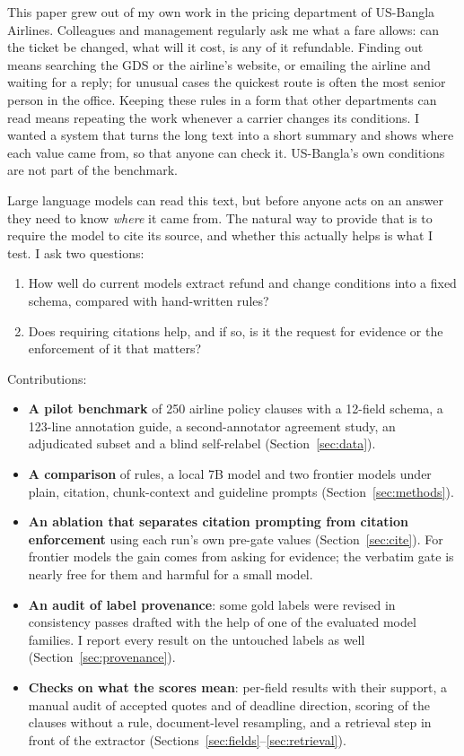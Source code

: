\documentclass[11pt,a4paper]{article}
\begin{document}
This paper grew out of my own work in the pricing department of US-Bangla Airlines. Colleagues and management regularly ask me what a fare allows: can the ticket be changed, what will it cost, is any of it refundable. Finding out means searching the GDS or the airline's website, or emailing the airline and waiting for a reply; for unusual cases the quickest route is often the most senior person in the office. Keeping these rules in a form that other departments can read means repeating the work whenever a carrier changes its conditions. I wanted a system that turns the long text into a short summary and shows where each value came from, so that anyone can check it. US-Bangla's own conditions are not part of the benchmark.

Large language models can read this text, but before anyone acts on an answer they need to know \emph{where} it came from. The natural way to provide that is to require the model to cite its source, and whether this actually helps is what I test. I ask two questions:
\begin{enumerate}
  \item How well do current models extract refund and change conditions into a fixed schema, compared with hand-written rules?
  \item Does requiring citations help, and if so, is it the request for evidence or the enforcement of it that matters?
\end{enumerate}

\noindent Contributions:
\begin{itemize}
  \item \textbf{A pilot benchmark} of 250 airline policy clauses with a 12-field schema, a 123-line annotation guide, a second-annotator agreement study, an adjudicated subset and a blind self-relabel (Section~\ref{sec:data}).
  \item \textbf{A comparison} of rules, a local 7B model and two frontier models under plain, citation, chunk-context and guideline prompts (Section~\ref{sec:methods}).
  \item \textbf{An ablation that separates citation prompting from citation enforcement} using each run's own pre-gate values (Section~\ref{sec:cite}). For frontier models the gain comes from asking for evidence; the verbatim gate is nearly free for them and harmful for a small model.
  \item \textbf{An audit of label provenance}: some gold labels were revised in consistency passes drafted with the help of one of the evaluated model families. I report every result on the untouched labels as well (Section~\ref{sec:provenance}).
  \item \textbf{Checks on what the scores mean}: per-field results with their support, a manual audit of accepted quotes and of deadline direction, scoring of the clauses without a rule, document-level resampling, and a retrieval step in front of the extractor (Sections~\ref{sec:fields}--\ref{sec:retrieval}).
\end{itemize}
\end{document}
